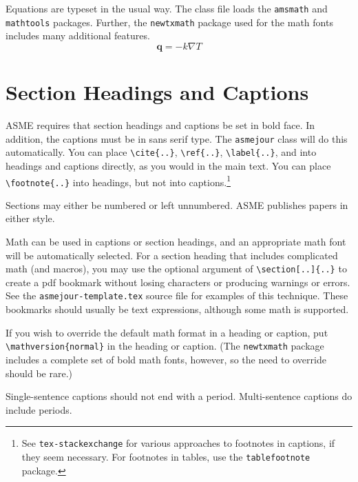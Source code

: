 \documentclass[subscriptcorrection,upint,varvw,mathalfa=cal=euler,barcolor=black,balance,hyphenate,french,pdf-a,nolists]{asmejour}
\begin{document}
Equations are typeset in the usual way.  The class file loads the \texttt{amsmath} and \texttt{mathtools} packages. Further, the \texttt{newtxmath} package used for the math fonts includes many additional features.
\begin{equation}\label{eqn:1}
\mathbf{q} = -k\nabla T
\end{equation}


\section{Section Headings and Captions}

ASME requires that section headings and captions be set in bold face. In addition, the captions must be in sans serif type. The \texttt{asmejour} class will do this automatically.  You can place \verb|\cite{..}|, \verb|\ref{..}|, \verb|\label{..}|, and into headings and captions directly, as you would in the main text.  You can place \verb|\footnote{..}| into headings, but not into captions.\footnote{See \texttt{tex-stackexchange} for various approaches to footnotes in captions, if they seem necessary. For footnotes in tables, use the \texttt{tablefootnote} package.}

Sections may either be numbered or left unnumbered. ASME publishes papers in either style.

Math can be used in captions or section headings, and an appropriate math font will be automatically selected. For a section heading that includes complicated math (and macros), you may use the optional argument of \verb|\section[..]{..}| to create a pdf bookmark without losing characters or producing warnings or errors. See the \texttt{asmejour-template.tex} source file for examples of this technique. These bookmarks should usually be text expressions, although some math is supported.

If you wish to override the default math format in a heading or caption, put \verb|\mathversion{normal}| in the heading or caption. (The \texttt{newtxmath} package \cite{sharpe1} includes a complete set of bold math fonts, however, so the need to override should be rare.)

Single-sentence captions should not end with a period. Multi-sentence captions do include periods.
\end{document}
